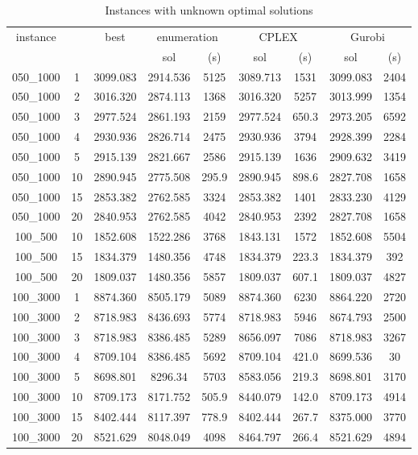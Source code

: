 \documentclass[10pt]{article}
\begin{document}
\begin{table}[h]\footnotesize
\caption{Instances with unknown optimal solutions}
	\centering
\begin{tabular}{ccc|cc|cc|cc}
\hline 
\multirow{2}{*}{{instance}} & \multirow{2}{*}{{}} & \multirow{2}{*}{{best}} & \multicolumn{2}{c|}{{enumeration}} & \multicolumn{2}{c|}{{CPLEX}} & \multicolumn{2}{c}{{Gurobi}}\tabularnewline
\cline{4-9} 
 &  &  & {sol} & { (s)} & {sol} & { (s)} & {sol} & { (s)}\tabularnewline
\hline 
{050\_1000} & {1} & {3099.083} & {2914.536} & {5125} & {3089.713} & {1531} & {3099.083} & {2404}\tabularnewline
{050\_1000} & {2} & {3016.320} & {2874.113} & {1368} & {3016.320} & {5257} & {3013.999} & {1354}\tabularnewline
{050\_1000} & {3} & {2977.524} & {2861.193} & {2159} & {2977.524} & {650.3} & {2973.205} & {6592}\tabularnewline
{050\_1000} & {4} & {2930.936} & {2826.714} & {2475} & {2930.936} & {3794} & {2928.399} & {2284}\tabularnewline
{050\_1000} & {5} & {2915.139} & {2821.667} & {2586} & {2915.139} & {1636} & {2909.632} & {3419}\tabularnewline
{050\_1000} & {10} & {2890.945} & {2775.508} & {295.9} & {2890.945} & {898.6} & {2827.708} & {1658}\tabularnewline
{050\_1000} & {15} & {2853.382} & {2762.585} & {3324} & {2853.382} & {1401} & {2833.230} & {4129}\tabularnewline
{050\_1000} & {20} & {2840.953} & {2762.585} & {4042} & {2840.953} & {2392} & {2827.708} & {1658}\tabularnewline
\hline 
{100\_500} & {10} & {1852.608} & {1522.286} & {3768} & {1843.131} & {1572} & {1852.608} & {5504}\tabularnewline
{100\_500} & {15} & {1834.379} & {1480.356} & {4748} & {1834.379} & {223.3} & {1834.379} & {392}\tabularnewline
{100\_500} & {20} & {1809.037} & {1480.356} & {5857} & {1809.037} & {607.1} & {1809.037} & {4827}\tabularnewline
\hline 
{100\_3000} & {1} & {8874.360} & {8505.179} & {5089} & {8874.360} & {6230} & {8864.220} & {2720}\tabularnewline
{100\_3000} & {2} & {8718.983} & {8436.693} & {5774} & {8718.983} & {5946} & {8674.793} & {2500}\tabularnewline
{100\_3000} & {3} & {8718.983} & {8386.485} & {5289} & {8656.097} & {7086} & {8718.983} & {3267}\tabularnewline
{100\_3000} & {4} & {8709.104} & {8386.485} & {5692} & {8709.104} & {421.0} & {8699.536} & {30}\tabularnewline
{100\_3000} & {5} & {8698.801} & {8296.34} & {5703} & {8583.056} & {219.3} & {8698.801} & {3170}\tabularnewline
{100\_3000} & {10} & {8709.173} & {8171.752} & {505.9} & {8440.079} & {142.0} & {8709.173} & {4914}\tabularnewline
{100\_3000} & {15} & {8402.444} & {8117.397} & {778.9} & {8402.444} & {267.7} & {8375.000} & {3770}\tabularnewline
{100\_3000} & {20} & {8521.629} & {8048.049} & {4098} & {8464.797} & {266.4} & {8521.629} & {4894}\tabularnewline
\end{tabular}\end{table}
\end{document}
